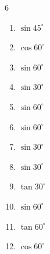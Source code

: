 \begin{multicols}{6}
\begin{enumerate}

  \item $\displaystyle \sin{45^\circ}$


  \item $\displaystyle \cos{60^\circ}$


  \item $\displaystyle \sin{60^\circ}$


  \item $\displaystyle \sin{30^\circ}$


  \item $\displaystyle \sin{60^\circ}$


  \item $\displaystyle \sin{60^\circ}$


  \item $\displaystyle \sin{30^\circ}$


  \item $\displaystyle \sin{30^\circ}$


  \item $\displaystyle \tan{30^\circ}$


  \item $\displaystyle \sin{60^\circ}$


\columnbreak %

  \item $\displaystyle \tan{60^\circ}$


  \item $\displaystyle \cos{60^\circ}$


\end{enumerate}
\end{multicols}
